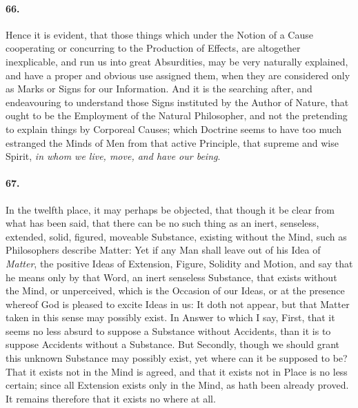 \documentclass[]{article}
\newenvironment{sectionbody}{}{}
\begin{document}
\begin{sectionbody}
\paragraph{66.} Hence it is evident, that those things which under the Notion of
a Cause cooperating or concurring to the Production of Effects,
are altogether inexplicable, and run us into great Absurdities,
may be very naturally explained, and have a proper and obvious
use assigned them, when they are considered only as Marks or
Signs for our Information.  And it is the searching after, and
endeavouring to understand those Signs instituted by the Author
of Nature, that ought to be the Employment of the Natural
Philosopher, and not the pretending to explain things by
Corporeal Causes; which Doctrine seems to have too much estranged
the Minds of Men from that active Principle, that supreme and
wise Spirit, \emph{in whom we live, move, and have our being}.



\paragraph{67.} In the twelfth place, it may perhaps be objected, that though it
be clear from what has been said, that there can be no such thing
as an inert, senseless, extended, solid, figured, moveable
Substance, existing without the Mind, such as Philosophers
describe Matter: Yet if any Man shall leave out of his Idea of
\emph{Matter}, the positive Ideas of Extension, Figure,
Solidity and Motion, and say that he means only by that Word, an
inert senseless Substance, that exists without the Mind, or
unperceived, which is the Occasion of our Ideas, or at the
presence whereof God is pleased to excite Ideas in us: It doth
not appear, but that Matter taken in this sense may possibly
exist.  In Answer to which I say, First, that it seems no less
absurd to suppose a Substance without Accidents, than it is to
suppose Accidents without a Substance.  But Secondly, though we
should grant this unknown Substance may possibly exist, yet where
can it be supposed to be?  That it exists not in the Mind is
agreed, and that it exists not in Place is no less certain; since
all Extension exists only in the Mind, as hath been already
proved.  It remains therefore that it exists no where at all.




\end{sectionbody}
\end{document}
